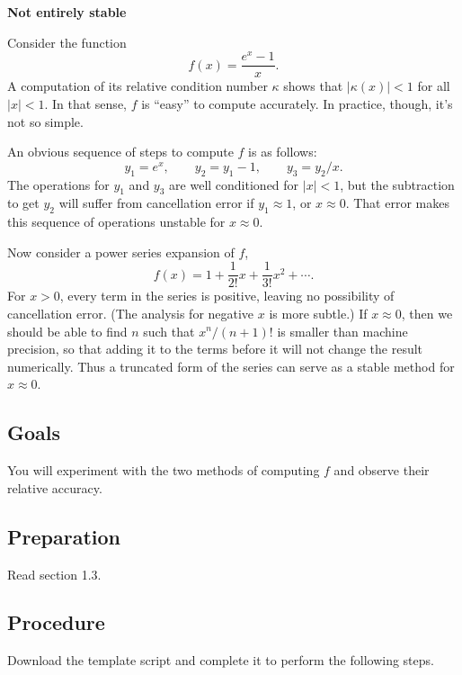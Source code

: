 \documentclass[11pt]{article}
\begin{document}
\begin{center}
  \bf Not entirely stable
\end{center}

Consider the function
\[
f(x) = \frac{e^x-1}{x}.
\]
A computation of its relative condition number $\kappa$ shows that $|\kappa(x)|<1$ for all $|x|<1$. In that sense, $f$ is ``easy'' to compute accurately. In practice, though, it's not so simple.

An obvious sequence of steps to compute $f$ is as follows:
\begin{equation}
  \label{direct}
  y_1 = e^x, \qquad y_2 = y_1 - 1, \qquad y_3 = y_2/x.
\end{equation}
The operations for $y_1$ and $y_3$ are well conditioned for $|x|<1$, but the subtraction to get $y_2$ will suffer from cancellation error if $y_1\approx 1$, or $x\approx 0$. That error makes this sequence of operations unstable for $x\approx 0$.

Now consider a power series expansion of $f$,
\begin{equation}
  \label{series}
  f(x) = 1 + \frac{1}{2!} x + \frac{1}{3!}x^2 + \cdots.
\end{equation}
For $x>0$, every term in the series is positive, leaving no possibility of cancellation error. (The analysis for negative $x$ is more subtle.) If $x\approx 0$, then we should be able to find $n$ such that $x^n/(n+1)!$ is smaller than machine precision, so that adding it to the terms before it will not change the result numerically. Thus a truncated form of the series can serve as a stable method for $x\approx 0$. 

\subsection*{Goals}

You will experiment with the two methods of computing $f$ and observe their relative accuracy. 

\subsection*{Preparation}

Read section 1.3.

\subsection*{Procedure}

Download the template script and complete it to perform the following steps. 
\end{document}
